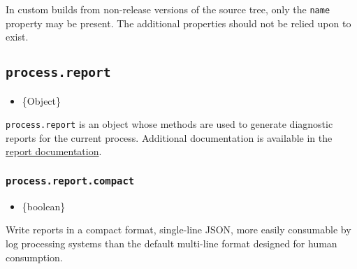\begin{Shaded}
\begin{Highlighting}[]
\NormalTok{\{}
  \OperatorTok{:} \OperatorTok{,}
  \OperatorTok{:} \OperatorTok{,}
  \OperatorTok{:} \OperatorTok{,}
  \OperatorTok{:} \OperatorTok{,}
  \OperatorTok{:} 
\NormalTok{\}}
\end{Highlighting}
\end{Shaded}

In custom builds from non-release versions of the source tree, only the
\texttt{name} property may be present. The additional properties should
not be relied upon to exist.

\subsection{\texorpdfstring{\texttt{process.report}}{process.report}}\label{process.report}

\begin{itemize}
\tightlist
\item
  \{Object\}
\end{itemize}

\texttt{process.report} is an object whose methods are used to generate
diagnostic reports for the current process. Additional documentation is
available in the \href{report.md}{report documentation}.

\subsubsection{\texorpdfstring{\texttt{process.report.compact}}{process.report.compact}}\label{process.report.compact}

\begin{itemize}
\tightlist
\item
  \{boolean\}
\end{itemize}

Write reports in a compact format, single-line JSON, more easily
consumable by log processing systems than the default multi-line format
designed for human consumption.

